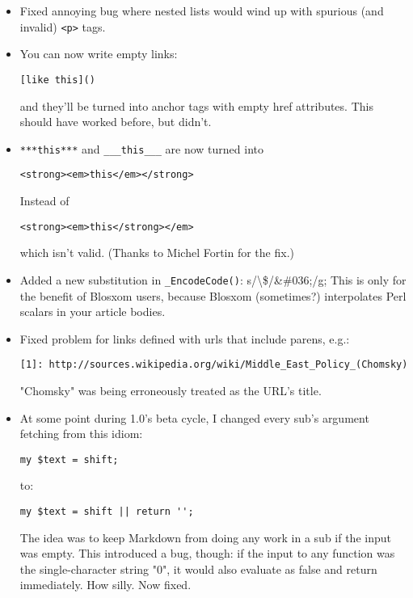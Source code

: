 \begin{itemize}
\item 

Fixed annoying bug where nested lists would wind up with
spurious (and invalid) \texttt{<p>} tags.
\item 

You can now write empty links:\begin{lstlisting}
[like this]()
\end{lstlisting}


and they'll be turned into anchor tags with empty href attributes.
This should have worked before, but didn't.
\item 

\texttt{***this***} and \texttt{\_\_\_this\_\_\_} are now turned into\begin{lstlisting}
<strong><em>this</em></strong>
\end{lstlisting}


Instead of\begin{lstlisting}
<strong><em>this</strong></em>
\end{lstlisting}


which isn't valid. (Thanks to Michel Fortin for the fix.)
\item 

Added a new substitution in \texttt{\_EncodeCode()}: s/{\textbackslash}\$/\&\#036;/g; This
is only for the benefit of Blosxom users, because Blosxom
(sometimes?) interpolates Perl scalars in your article bodies.
\item 

Fixed problem for links defined with urls that include parens, e.g.:\begin{lstlisting}
[1]: http://sources.wikipedia.org/wiki/Middle_East_Policy_(Chomsky)
\end{lstlisting}


"Chomsky" was being erroneously treated as the URL's title.
\item 

At some point during 1.0's beta cycle, I changed every sub's
argument fetching from this idiom:\begin{lstlisting}
my $text = shift;
\end{lstlisting}


to:\begin{lstlisting}
my $text = shift || return '';
\end{lstlisting}


The idea was to keep Markdown from doing any work in a sub
if the input was empty. This introduced a bug, though:
if the input to any function was the single-character string
"0", it would also evaluate as false and return immediately.
How silly. Now fixed.
\end{itemize}


